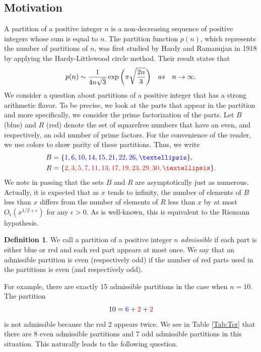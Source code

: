 \documentclass[11pt]{amsart}
\numberwithin{equation}{section}
\numberwithin{figure}{section}
\theoremstyle{definition}
\newtheorem{definition}{Definition}[section]
\begin{document}
\subsection{Motivation}\label{Motivation}
A partition of a positive integer $n$ is a non-decreasing sequence of positive integers whose sum is equal to $n$. The partition function $p(n)$, which represents the number of partitions of $n$, was first studied by Hardy and Ramanujan \cite{hardyramanujan} in 1918 by applying the Hardy-Littlewood circle method. Their result states that
\begin{align*}
    p(n) \sim \frac{1}{4n\sqrt{3}} \exp \bigg(\pi\sqrt{\frac{2n}{3}}\bigg) \quad \textnormal{as} \quad n \to \infty.
\end{align*}
We consider a question about partitions of a positive integer that has a strong arithmetic flavor. To be precise, we look at the parts that appear in the partition and more specifically, we consider the prime factorization of the parts. Let $B$ (blue) and $R$ (red) denote the set of squarefree numbers that have an even, and respectively, an odd number of prime factors. For the convenience of the reader, we use colors to show parity of these partitions. Thus, we write
\begin{align*}
B &= \{ \textcolor{blue}{1, 6, 10, 14, 15, 21, 22, 26,\dots} \}, \nonumber \\
R &= \{ \textcolor{red}{2, 3, 5, 7, 11, 13, 17, 19, 23, 29, 30, \dots}  \}.
\end{align*}
We note in passing that the sets $B$ and $R$ are asymptotically just as numerous. Actually, it is expected that as $x$ tends to infinity, the number of elements of $B$ less than $x$ differs from the number of elements of $R$ less than $x$ by at most $O_{\epsilon} (x^{1/2 + \epsilon})$ for any $\epsilon>0$. As is well-known, this is equivalent to the Riemann hypothesis.

\begin{definition}
We call a partition of a positive integer $n$ \textit{admissible} if each part is either blue or red and each red part appears at most once. We say that an admissible partition is even (respectively odd) if the number of red parts used in the partitions is even (and respectively odd).
\end{definition}
 For example, there are exactly 15 admissible partitions in the case when $n=10$. The partition
\begin{align*}
    10 = \textcolor{blue}{6} + \textcolor{red}{2} + \textcolor{red}{2} 
\end{align*}
is not admissible because the red 2 appears twice. We see in Table \ref{Tab:Tcr} that there are $8$ even admissible partitions and $7$ odd admissible partitions in this situation. This naturally leads to the following question.
\end{document}
